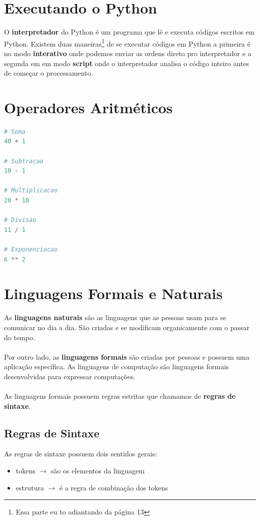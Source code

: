 \documentclass[a4paper,11pt]{book}
\begin{document}
\section{Executando o Python}
O \textbf{interpretador} do Python é um programa que lê e executa códigos escritos em Python. Existem duas maneiras\footnote{Essa parte eu to adiantando da página 13} de se executar códigos em Python
a primeira é no modo \textbf{interativo} onde podemos enviar as ordens direto pro interpretador e a segunda em em modo \textbf{script} onde
o interpretador analisa o código inteiro antes de começar o processamento.

\section{Operadores Aritméticos}
\begin{lstlisting}[language=Python, caption=Operadores Básicos]
# Soma
40 + 1

# Subtracao
10 - 1

# Multiplicacao
20 * 10

# Divisao
11 / 1

# Exponenciacao
6 ** 2

\end{lstlisting}

\section{Linguagens Formais e Naturais}

As \textbf{linguagens naturais} são as linguagens que as pessoas usam para se comunicar no dia a dia. São criadas e se modificam organicamente com o passar do tempo.
\\
\\
Por outro lado, as \textbf{linguagens formais} são criadas por pessoas e possuem uma aplicação específica. As linguagens de computação são linguagens formais desenvolvidas para expressar computações.
\\
\\
As linguagens formais possuem regras estritas que chamamos de \textbf{regras de sintaxe}.

\subsection{Regras de Sintaxe}

As regras de sintaxe possuem dois sentidos gerais:
\begin{itemize}
	\item tokens $\rightarrow$ são os elementos da linguagem
	\item estrutura $\rightarrow$ é a regra de combinação dos tokens
\end{itemize}
\end{document}

